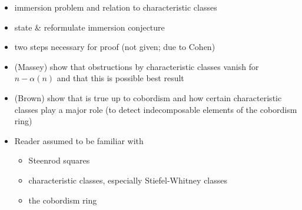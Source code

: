 \begin{itemize}
\item immersion problem and relation to characteristic classes
\item state \& reformulate immersion conjecture
\item two steps necessary for proof (not given; due to Cohen)
\item (Massey) show that obstructions by characteristic classes vanish for
  $n-\alpha(n)$ and that this is possible best result
\item (Brown) show that is true up to cobordism and how certain
  characteristic classes play a major role (to detect indecomposable
  elements of the cobordism ring)
\item Reader assumed to be familiar with
  \begin{itemize}
  \item Steenrod squares
  \item characteristic classes, especially Stiefel-Whitney classes
  \item the cobordism ring
  \end{itemize}
\end{itemize}

